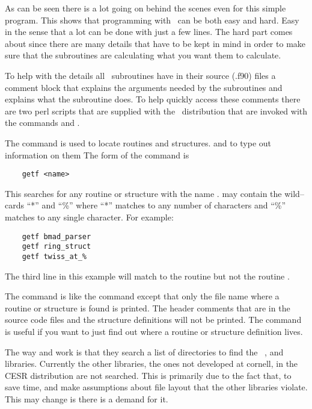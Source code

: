 As can be seen there is a lot going on behind the scenes even for this
simple program. This shows that programming with \bmad\ can be both easy
and hard. Easy in the sense that a lot can be done with just a few
lines. The hard part comes about since there are many details that
have to be kept in mind in order to make sure that the subroutines
are calculating what you want them to calculate.

To help with the details all \bmad\ subroutines have in their source (.f90)
files a comment block that explains the arguments needed by the
subroutines and explains what the subroutine does. To help quickly
access these comments there are two perl scripts that are supplied
with the \bmad\ distribution that are invoked with the commands
 and .

The  command is used to locate routines and structures.
and to type out information on them
The form of the command is
\begin{verbatim}
    getf <name>
\end{verbatim}
This searches for any routine or structure with the name
.  may contain the wild--cards ``*'' and ``\%'' where
``*'' matches to any number of characters and ``\%'' matches to any
single character. For example:
\begin{verbatim}
    getf bmad_parser
    getf ring_struct
    getf twiss_at_%
\end{verbatim}
The third line in this example will match to the routine  but not
the routine .

The  command is like the  command except that only
the file name where a routine or structure is found is printed. The
header comments that are in the source code files and the structure
definitions will not be printed. The  command is useful if you
want to just find out where a routine or structure definition lives.

The way  and  work is that they search a list of
directories to find the \bmad\, , and 
libraries. Currently the other libraries, the ones not developed at cornell,
in the CESR distribution are not searched. This is primarily due to 
the fact that, to save time,  and  make assumptions
about file layout that the other libraries violate. This may change is there
is a demand for it.

